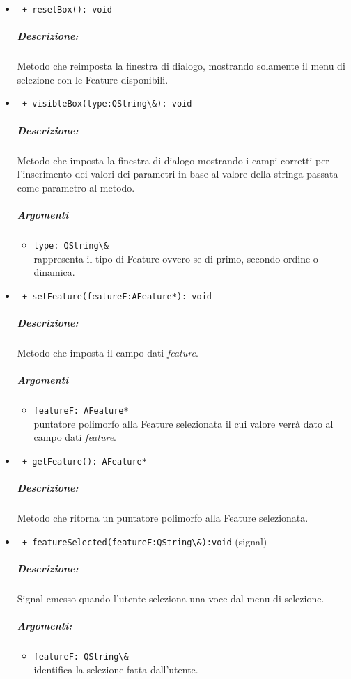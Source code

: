 \begin{itemize}
\item \color{blue}\verb! + resetBox(): void!
\color{black} 
\subparagraph{Descrizione:} Metodo che reimposta la finestra di dialogo, mostrando solamente il menu di selezione con le Feature{} disponibili.

\item \color{blue}\verb! + visibleBox(type:QString\&): void!
\color{black}
\subparagraph{Descrizione:} Metodo che imposta la finestra di dialogo mostrando i campi corretti per l'inserimento dei valori dei parametri in base al valore della stringa passata come parametro al metodo.\\
\subparagraph{Argomenti}
\begin{itemize}
\item \color{RoyalPurple} \verb!type: QString\& ! \\ rappresenta il tipo di Feature\g{} ovvero se di primo, secondo ordine o dinamica.
\end{itemize}

\item \color{blue}\verb! + setFeature(featureF:AFeature*): void!
\color{black}
\subparagraph{Descrizione:} Metodo che imposta il campo dati \emph{feature}.\\
\subparagraph{Argomenti}
\begin{itemize}
\item \color{RoyalPurple} \verb!featureF: AFeature* !\\ puntatore polimorfo alla Feature\g{} selezionata il cui valore verrà dato al campo dati \emph{feature}.
\end{itemize}

\item \color{blue}\verb! + getFeature(): AFeature*!
\color{black}
\subparagraph{Descrizione:} Metodo che ritorna un puntatore polimorfo alla Feature\g{} selezionata.\\

\item \color{blue}\verb! + featureSelected(featureF:QString\&):void! (signal)
\color{black} 
\subparagraph{Descrizione:} Signal\g{} emesso quando l'utente seleziona una voce dal menu di selezione.
\subparagraph{Argomenti:}
\begin{itemize}
\item \color{RoyalPurple} \verb!featureF: QString\& !\\ identifica la selezione fatta dall'utente.
\end{itemize}


\end{itemize}
